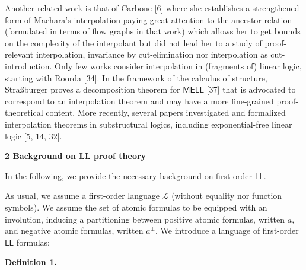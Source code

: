 \documentclass[10pt,a4paper]{article}
\begin{document}
Another related work is that of Carbone [6] where she establishes a strengthened form of Maehara’s interpolation paying great attention to the ancestor relation (formulated in terms of flow graphs in that work) which allows her to get bounds on the complexity of the interpolant but did not lead her to a study of proof-relevant interpolation, invariance by cut-elimination nor interpolation as cut-introduction. Only few works consider interpolation in (fragments of) linear logic, starting with Roorda [34]. In the framework of the calculus of structure, Straßburger proves a decomposition theorem for $\mathsf{MELL}$ [37] that is advocated to correspond to an interpolation theorem and may have a more fine-grained proof-theoretical content. More recently, several papers investigated and formalized interpolation theorems in substructural logics, including exponential-free linear logic [5, 14, 32].\par
 
 
 


 
\par\medskip\noindent\textbf{2 Background on LL proof theory}\par
 
 
In the following, we provide the necessary background on first-order $\mathsf{LL}$.\par
 
 
 
As usual, we assume a first-order language $\mathcal{L}$ (without equality nor function symbols). We assume the set of atomic formulas to be equipped with an involution, inducing a partitioning between positive atomic formulas, written $a$, and negative atomic formulas, written $a^{\perp}$. We introduce a language of first-order $\mathsf{LL}$ formulas:\par
 
 
 
\par\medskip\noindent\textbf{Definition 1.}\par
 
 
\end{document}
